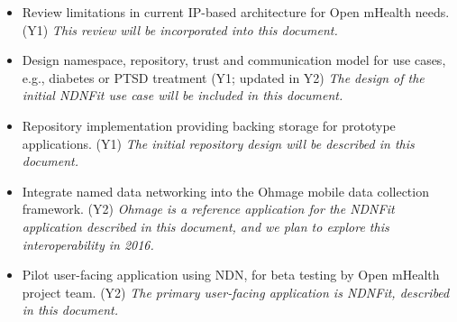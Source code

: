 \begin{itemize}
\item Review limitations in current IP-based architecture for Open mHealth needs. (Y1) \emph{This review will be incorporated into this document.} 
\item Design namespace, repository, trust and communication model for use cases, e.g., diabetes or PTSD treatment (Y1; updated in Y2) \emph{The design of the initial NDNFit use case will be included in this document.} 
\item Repository implementation providing backing storage for prototype applications. (Y1) \emph{The initial repository design will be described in this document.}
\item Integrate named data networking into the Ohmage mobile data collection framework. (Y2) \emph{Ohmage is a reference application for the NDNFit application described in this document, and we plan to explore this interoperability in 2016.}
\item Pilot user-facing application using NDN, for beta testing by Open mHealth project team. (Y2) \emph{The primary user-facing application is NDNFit, described in this document.} 
\end{itemize}






